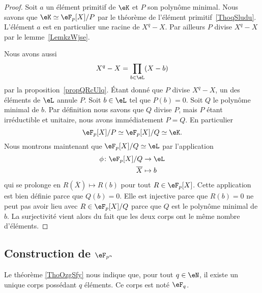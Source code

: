 \begin{proof}
	Soit \( a\) un élément primitif de \( \eK\) et \( P\) son polynôme minimal. Nous savons que \( \eK\simeq \eF_p[X]/P\) par le théorème de l'élément primitif~\ref{ThoqSludu}. L'élément \( a\) est en particulier une racine de \( X^q-X\). Par ailleurs \( P\) divise \( X^q-X\) par le lemme~\ref{LemkzWjse}.

	Nous avons aussi
	\begin{equation}
		X^q-X=\prod_{b\in \eL}(X-b)
	\end{equation}
	par la proposition~\ref{propQRcUlq}. Étant donné que \( P\) divise \( X^q-X\), un des éléments de \( \eL\) annule \( P\). Soit \( b\in \eL\) tel que \( P(b)=0\). Soit \( Q\) le polynôme minimal de \( b\). Par définition nous savons que \( Q\) divise \( P\), mais \( P\) étant irréductible et unitaire, nous avons immédiatement \( P=Q\). En particulier
	\begin{equation}
		\eF_p[X]/P\simeq\eF_p[X]/Q\simeq \eK.
	\end{equation}
	Nous montrons maintenant que \( \eF_p[X]/Q\simeq \eL\) par l'application
	\begin{equation}
		\begin{aligned}
			\phi\colon \eF_p[X]/Q & \to \eL       \\
			\overline        X    & \mapsto b
		\end{aligned}
	\end{equation}
	qui se prolonge en \( R(\overline X)\mapsto R(b)\) pour tout \( R\in \eF_p[X]\). Cette application est bien définie parce que \( Q(b)=0\). Elle est injective parce que \( R(b)=0\) ne peut pas avoir lieu avec \( R\in \eF_p[X]/Q\) parce que \( Q\) est le polynôme minimal de \( b\). La surjectivité vient alors du fait que les deux corps ont le même nombre d'éléments.
\end{proof}

\subsection{Construction de \( \eF_{p^n}\)}

Le théorème \ref{ThoOzgSfy} nous indique que, pour tout \( q\in \eN\), il existe un unique corps possédant \( q\) éléments. Ce corps est noté \( \eF_{q}\).

